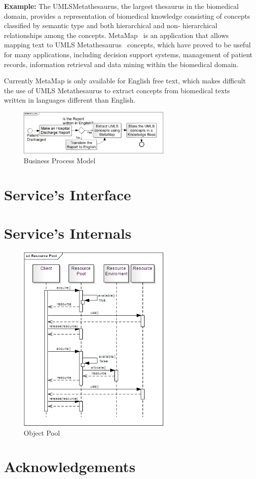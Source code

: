 \documentclass[11pt]{article}
\begin{document}
{\bf Example:} The UMLS\textregistered Metathesaurus\textregistered, the largest thesaurus in the biomedical domain, provides a 
representation of biomedical knowledge consisting of concepts classified by semantic type and both hierarchical and non-
hierarchical relationships among the concepts. MetaMap~\cite{metamap} is an application that allows mapping text to UMLS\textregistered 
Metathesaurus\textregistered~\cite{umls} concepts, which have proved to be useful for many applications, including decision support systems, 
management of patient records, information retrieval and data mining within the biomedical domain. 

Currently MetaMap is only available for English free text, which makes difficult the use of UMLS Metathesaurus to extract concepts from 
biomedical texts written in languages different than English.


\begin{figure}[!ht]
\begin{center}
\includegraphics[width=7.5cm]{mtsoa}
\end{center}
\caption{Business Process Model}
\label{fig:mtsoa}
\end{figure}

\section{Service's Interface}


\section{Service's Internals}

\begin{figure}[!ht]
\begin{center}
\includegraphics[width=7.5cm]{resource_pool}
\end{center}
\caption{Object Pool}
\label{fig:rp}
\end{figure}

\section{Acknowledgements}





\end{document}
